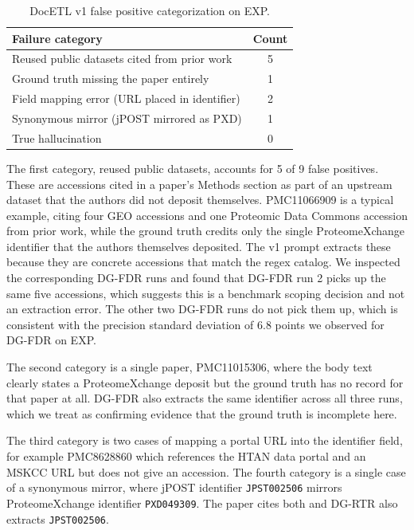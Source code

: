 \documentclass[sigconf,nonacm]{acmart}
\begin{document}
\begin{table}[h]
\centering
\small
\begin{tabularx}{\columnwidth}{Xc}
\toprule
\textbf{Failure category} & \textbf{Count} \\
\midrule
Reused public datasets cited from prior work & 5 \\
Ground truth missing the paper entirely     & 1 \\
Field mapping error (URL placed in identifier) & 2 \\
Synonymous mirror (jPOST mirrored as PXD)   & 1 \\
True hallucination                          & 0 \\
\bottomrule
\end{tabularx}
\caption{DocETL v1 false positive categorization on EXP.}
\label{tab:fp}
\end{table}

The first category, reused public datasets, accounts for 5 of 9 false positives. These are accessions cited in a paper's Methods section as part of an upstream dataset that the authors did not deposit themselves. PMC11066909 is a typical example, citing four GEO accessions and one Proteomic Data Commons accession from prior work, while the ground truth credits only the single ProteomeXchange identifier that the authors themselves deposited. The v1 prompt extracts these because they are concrete accessions that match the regex catalog. We inspected the corresponding DG-FDR runs and found that DG-FDR run 2 picks up the same five accessions, which suggests this is a benchmark scoping decision and not an extraction error. The other two DG-FDR runs do not pick them up, which is consistent with the precision standard deviation of 6.8 points we observed for DG-FDR on EXP.

The second category is a single paper, PMC11015306, where the body text clearly states a ProteomeXchange deposit but the ground truth has no record for that paper at all. DG-FDR also extracts the same identifier across all three runs, which we treat as confirming evidence that the ground truth is incomplete here.

The third category is two cases of mapping a portal URL into the identifier field, for example PMC8628860 which references the HTAN data portal and an MSKCC URL but does not give an accession. The fourth category is a single case of a synonymous mirror, where jPOST identifier \texttt{JPST002506} mirrors ProteomeXchange identifier \texttt{PXD049309}. The paper cites both and DG-RTR also extracts \texttt{JPST002506}.
\end{document}
